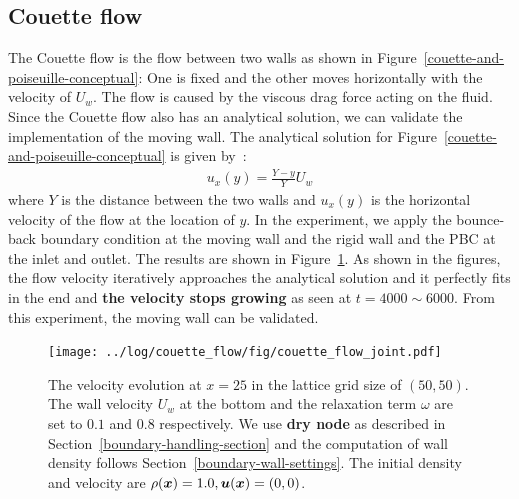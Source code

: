 \subsection{Couette flow}
The Couette flow is the flow between two walls as shown in
Figure~\ref{couette-and-poiseuille-conceptual}:
One is fixed and the other moves horizontally with the velocity of $U_w$.
The flow is caused by the viscous drag force acting on the fluid.
Since the Couette flow also has an analytical solution,
we can validate the implementation of the moving wall.
The analytical solution for Figure~\ref{couette-and-poiseuille-conceptual} is given by~\cite{nagy2019graphical}:
\begin{equation}
\begin{aligned}
  u_x(y) =\frac{Y - y}{Y}U_w
\end{aligned}
\end{equation}
where $Y$ is the distance between the two walls
and $u_x(y)$ is the horizontal velocity of the flow
at the location of $y$. 
In the experiment, we apply the bounce-back boundary condition
at the moving wall and the rigid wall
and the PBC at the inlet and outlet.
The results are shown in Figure~\ref{fig:couette-velocity-evolution}.
As shown in the figures, the flow velocity iteratively approaches
the analytical solution and it perfectly fits in the end
and {\bf the velocity stops growing} as seen at $t=4000 \sim 6000$.
From this experiment, the moving wall can be validated.

\begin{figure}[H]
  \vspace{-1mm}
  \centering
  \texttt{[image: ../log/couette\_flow/fig/couette\_flow\_joint.pdf]}
  \vspace{-5mm}
  \caption{The velocity evolution at
  $x = 25$ in the lattice grid size of $(50, 50)$.
  The wall velocity $U_w$ at the bottom and the relaxation term $\omega$ are set
  to $0.1$ and $0.8$ respectively.
  We use {\bf dry node} as described in Section~\ref{boundary-handling-section}
  and the computation of wall density follows Section~\ref{boundary-wall-settings}.
  The initial density and velocity are $\rho(\boldsymbol{x}) = 1.0, \boldsymbol{u}(\boldsymbol{x}) = (0, 0)$.
  \label{fig:couette-velocity-evolution}}
\end{figure}

